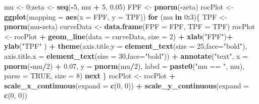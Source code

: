 \documentclass[
]{book}
\newenvironment{Shaded}{\begin{snugshade}}{\end{snugshade}}
\newcommand{\ControlFlowTok}[1]{\textcolor[rgb]{0.13,0.29,0.53}{\textbf{#1}}}
\newcommand{\DataTypeTok}[1]{\textcolor[rgb]{0.13,0.29,0.53}{#1}}
\newcommand{\DecValTok}[1]{\textcolor[rgb]{0.00,0.00,0.81}{#1}}
\newcommand{\FloatTok}[1]{\textcolor[rgb]{0.00,0.00,0.81}{#1}}
\newcommand{\KeywordTok}[1]{\textcolor[rgb]{0.13,0.29,0.53}{\textbf{#1}}}
\newcommand{\NormalTok}[1]{#1}
\newcommand{\OperatorTok}[1]{\textcolor[rgb]{0.81,0.36,0.00}{\textbf{#1}}}
\newcommand{\OtherTok}[1]{\textcolor[rgb]{0.56,0.35,0.01}{#1}}
\newcommand{\StringTok}[1]{\textcolor[rgb]{0.31,0.60,0.02}{#1}}
\begin{document}
\begin{Shaded}
\begin{Highlighting}[]
\NormalTok{mu \textless{}{-}}\StringTok{ }\DecValTok{0}\NormalTok{;zeta \textless{}{-}}\StringTok{ }\KeywordTok{seq}\NormalTok{(}\OperatorTok{{-}}\DecValTok{5}\NormalTok{, mu }\OperatorTok{+}\StringTok{ }\DecValTok{5}\NormalTok{, }\FloatTok{0.05}\NormalTok{)}
\NormalTok{FPF \textless{}{-}}\StringTok{ }\KeywordTok{pnorm}\NormalTok{(}\OperatorTok{{-}}\NormalTok{zeta)}
\NormalTok{rocPlot \textless{}{-}}\StringTok{ }\KeywordTok{ggplot}\NormalTok{(}\DataTypeTok{mapping =} \KeywordTok{aes}\NormalTok{(}\DataTypeTok{x =}\NormalTok{ FPF, }\DataTypeTok{y =}\NormalTok{ TPF))}
\ControlFlowTok{for}\NormalTok{ (mu }\ControlFlowTok{in} \DecValTok{0}\OperatorTok{:}\DecValTok{3}\NormalTok{)\{}
\NormalTok{  TPF \textless{}{-}}\StringTok{ }\KeywordTok{pnorm}\NormalTok{(mu}\OperatorTok{{-}}\NormalTok{zeta)}
\NormalTok{  curveData \textless{}{-}}\StringTok{ }\KeywordTok{data.frame}\NormalTok{(}\DataTypeTok{FPF =}\NormalTok{ FPF, }\DataTypeTok{TPF =}\NormalTok{ TPF)}
\NormalTok{  rocPlot \textless{}{-}}\StringTok{ }\NormalTok{rocPlot }\OperatorTok{+}\StringTok{ }
\StringTok{    }\KeywordTok{geom\_line}\NormalTok{(}\DataTypeTok{data =}\NormalTok{ curveData, }\DataTypeTok{size =} \DecValTok{2}\NormalTok{) }\OperatorTok{+}\StringTok{ }
\StringTok{    }\KeywordTok{xlab}\NormalTok{(}\StringTok{"FPF"}\NormalTok{)}\OperatorTok{+}\StringTok{ }\KeywordTok{ylab}\NormalTok{(}\StringTok{"TPF"}\NormalTok{ ) }\OperatorTok{+}\StringTok{ }
\StringTok{    }\KeywordTok{theme}\NormalTok{(}\DataTypeTok{axis.title.y =} \KeywordTok{element\_text}\NormalTok{(}\DataTypeTok{size =} \DecValTok{25}\NormalTok{,}\DataTypeTok{face=}\StringTok{"bold"}\NormalTok{),}
          \DataTypeTok{axis.title.x =} \KeywordTok{element\_text}\NormalTok{(}\DataTypeTok{size =} \DecValTok{30}\NormalTok{,}\DataTypeTok{face=}\StringTok{"bold"}\NormalTok{))  }\OperatorTok{+}
\StringTok{    }\KeywordTok{annotate}\NormalTok{(}\StringTok{"text"}\NormalTok{, }
             \DataTypeTok{x =} \KeywordTok{pnorm}\NormalTok{(}\OperatorTok{{-}}\NormalTok{mu}\OperatorTok{/}\DecValTok{2}\NormalTok{) }\OperatorTok{+}\StringTok{ }\FloatTok{0.07}\NormalTok{, }
             \DataTypeTok{y =} \KeywordTok{pnorm}\NormalTok{(mu}\OperatorTok{/}\DecValTok{2}\NormalTok{), }
             \DataTypeTok{label =} \KeywordTok{paste0}\NormalTok{(}\StringTok{"mu == "}\NormalTok{, mu), }
             \DataTypeTok{parse =} \OtherTok{TRUE}\NormalTok{, }\DataTypeTok{size =} \DecValTok{8}\NormalTok{)}
  \ControlFlowTok{next}
\NormalTok{\}}
\NormalTok{rocPlot \textless{}{-}}\StringTok{ }\NormalTok{rocPlot }\OperatorTok{+}
\StringTok{  }\KeywordTok{scale\_x\_continuous}\NormalTok{(}\DataTypeTok{expand =} \KeywordTok{c}\NormalTok{(}\DecValTok{0}\NormalTok{, }\DecValTok{0}\NormalTok{)) }\OperatorTok{+}\StringTok{ }
\StringTok{  }\KeywordTok{scale\_y\_continuous}\NormalTok{(}\DataTypeTok{expand =} \KeywordTok{c}\NormalTok{(}\DecValTok{0}\NormalTok{, }\DecValTok{0}\NormalTok{))     }


\end{Highlighting}
\end{Shaded}
\end{document}

